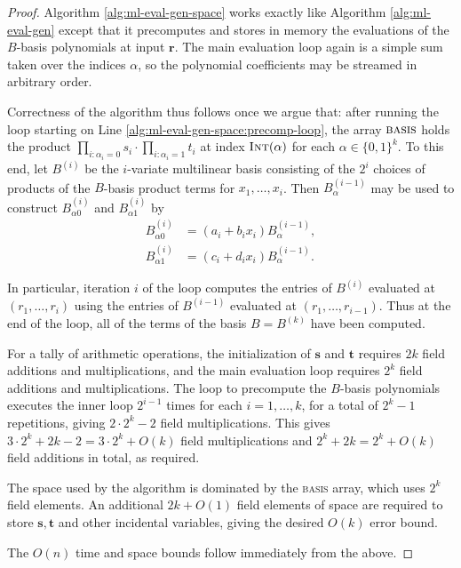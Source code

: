 \documentclass[12pt]{article}
\theoremstyle{plain}
\theoremstyle{definition}
\newcommand*{\av}[1]{\textsc{{#1}}}
\newcommand*{\fn}[1]{\textsc{{#1}}}
\renewcommand*{\vec}[1]{{\mathbf{#1}}}
\begin{document}
\begin{proof}
  Algorithm \ref{alg:ml-eval-gen-space} works exactly like Algorithm \ref{alg:ml-eval-gen} except that it precomputes and stores in memory the evaluations of the $B$-basis polynomials at input $\vec{r}$.  The main evaluation loop again is a simple sum taken over the indices $\alpha$, so the polynomial coefficients may be streamed in arbitrary order.

  Correctness of the algorithm thus follows once we argue that: after running the loop starting on Line \ref{alg:ml-eval-gen-space:precomp-loop}, the array $\av{basis}$ holds the product $\prod_{i : \alpha_i = 0} s_i \cdot \prod_{i : \alpha_i = 1} t_i$ at index $\fn{Int}(\alpha)$ for each $\alpha \in \{0, 1\}^k$.  To this end, let $B^{(i)}$ be the $i$-variate multilinear basis consisting of the $2^i$ choices of products of the $B$-basis product terms for $x_1, \ldots, x_i$.  Then $B^{(i-1)}_\alpha$ may be used to construct $B^{(i)}_{\alpha 0}$ and $B^{(i)}_{\alpha 1}$ by
  \begin{align*}
    B^{(i)}_{\alpha 0} &= (a_i + b_i x_i) B^{(i-1)}_\alpha, \\
    B^{(i)}_{\alpha 1} &= (c_i + d_i x_i) B^{(i-1)}_\alpha.
  \end{align*}

  In particular, iteration $i$ of the loop computes the entries of $B^{(i)}$ evaluated at $(r_1, \ldots, r_i)$ using the entries of $B^{(i-1)}$ evaluated at $(r_1, \ldots, r_{i-1})$.  Thus at the end of the loop, all of the terms of the basis $B = B^{(k)}$ have been computed.

  For a tally of arithmetic operations, the initialization of $\vec{s}$ and $\vec{t}$ requires $2k$ field additions and multiplications, and the main evaluation loop requires $2^k$ field additions and multiplications.  The loop to precompute the $B$-basis polynomials executes the inner loop $2^{i-1}$ times for each $i = 1, \ldots, k$, for a total of $2^k - 1$ repetitions, giving $2 \cdot 2^k - 2$ field multiplications.  This gives $3 \cdot 2^k + 2k - 2 = 3 \cdot 2^k + O(k)$ field multiplications and $2^k + 2k = 2^k + O(k)$ field additions in total, as required.

  The space used by the algorithm is dominated by the \av{basis} array, which uses $2^k$ field elements.  An additional $2k + O(1)$ field elements of space are required to store $\vec{s}, \vec{t}$ and other incidental variables, giving the desired $O(k)$ error bound.

  The $O(n)$ time and space bounds follow immediately from the above.
\end{proof}
\end{document}
